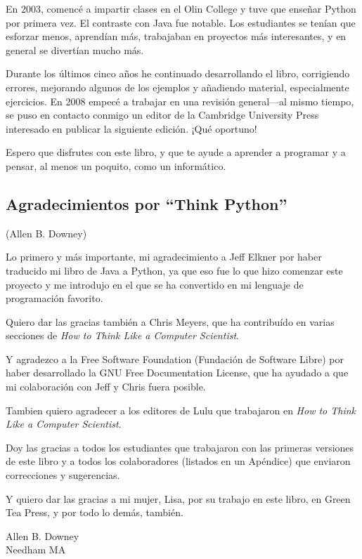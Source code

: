 En 2003, comencé a impartir clases en el Olin College y tuve que enseñar
Python por primera vez. El contraste con Java fue notable.
Los estudiantes se tenían que esforzar menos, aprendían más, trabajaban
en proyectos más interesantes, y en general se divertían mucho más.

Durante los últimos cinco años he continuado desarrollando el libro,
corrigiendo errores, mejorando algunos de los ejemplos y
añadiendo material, especialmente ejercicios. En 2008 empecé a trabajar
en una revisión general---al mismo tiempo, se puso en contacto conmigo
un editor de la Cambridge University Press interesado en publicar la
siguiente edición. ¡Qué oportuno!

Espero que disfrutes con este libro, y que te ayude
a aprender a programar y a pensar, al menos un poquito, como
un informático.

\subsection*{Agradecimientos por ``Think Python''}

(Allen B. Downey)

Lo primero y más importante, mi agradecimiento a Jeff Elkner por
haber traducido mi libro de Java a Python, ya que eso fue lo que hizo
comenzar este proyecto y me introdujo en el que se ha convertido
en mi lenguaje de programación favorito.

Quiero dar las gracias también a Chris Meyers, que ha contribuído en varias
secciones de \emph{How to Think Like a Computer Scientist}.

Y agradezco a la Free Software Foundation (Fundación de Software Libre) por
haber desarrollado la GNU Free Documentation License, que ha ayudado
a que mi colaboración con Jeff y Chris fuera posible.


Tambien quiero agradecer a los editores de Lulu que trabajaron en
\emph{How to Think Like a Computer Scientist}.

Doy las gracias a todos los estudiantes que trabajaron con las
primeras versiones de este libro y a todos los colaboradores (listados
en un Apéndice) que enviaron correcciones y sugerencias.

Y quiero dar las gracias a mi mujer, Lisa, por su trabajo en este libro, en Green
Tea Press, y por todo lo demás, también.

Allen B. Downey \\
Needham MA\\

